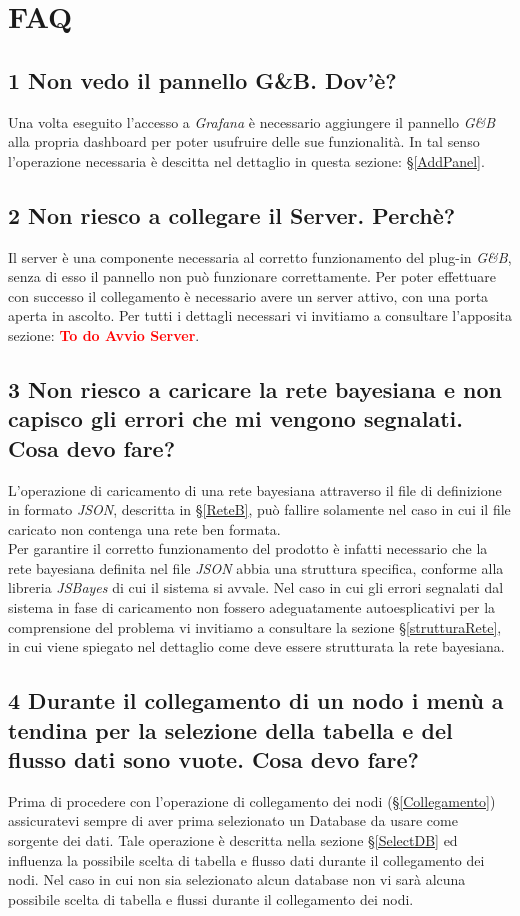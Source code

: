 \section{FAQ}\label{FAQ}


\subsection*{1 Non vedo il pannello G\&B. Dov'è?}
Una volta eseguito l'accesso a \textit{Grafana} è necessario aggiungere il pannello \textit{G\&B} alla propria dashboard per poter usufruire delle sue funzionalità. In tal senso l'operazione necessaria è descitta nel dettaglio in questa sezione: §\ref{AddPanel}.

\subsection*{2 Non riesco a collegare il Server. Perchè?}
Il server è una componente necessaria al corretto funzionamento del plug-in \textit{G\&B}, senza di esso il pannello non può funzionare correttamente. Per poter effettuare con successo il collegamento è necessario avere un server attivo, con una porta aperta in ascolto. Per tutti i dettagli necessari vi invitiamo a consultare l'apposita sezione: \textbf{\textcolor{red}{To do Avvio Server}}.

\subsection*{3 Non riesco a caricare la rete bayesiana e non capisco gli errori che mi vengono segnalati. Cosa devo fare?}
L'operazione di caricamento di una rete bayesiana attraverso il file di definizione in formato \textit{JSON}, descritta in §\ref{ReteB}, può fallire solamente nel caso in cui il file caricato non contenga una rete ben formata.\\
Per garantire il corretto funzionamento del prodotto è infatti necessario che la rete bayesiana definita nel file \textit{JSON} abbia una struttura specifica, conforme alla libreria \textit{JSBayes} di cui il sistema si avvale. Nel caso in cui gli errori segnalati dal sistema in fase di caricamento non fossero adeguatamente autoesplicativi per la comprensione del problema vi invitiamo a consultare la sezione §\ref{strutturaRete}, in cui viene spiegato nel dettaglio come deve essere strutturata la rete bayesiana.

\subsection*{4 Durante il collegamento di un nodo i menù a tendina per la selezione della tabella e del flusso dati sono vuote. Cosa devo fare?}
Prima di procedere con l'operazione di collegamento dei nodi (§\ref{Collegamento}) assicuratevi sempre di aver prima selezionato un Database da usare come sorgente dei dati. Tale operazione è descritta nella sezione §\ref{SelectDB} ed influenza la possibile scelta di tabella e flusso dati durante il collegamento dei nodi. Nel caso in cui non sia selezionato alcun database non vi sarà alcuna possibile scelta di tabella e flussi durante il collegamento dei nodi.

